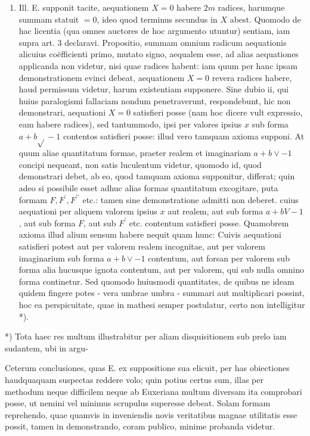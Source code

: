 \documentclass[10pt]{article}
\begin{document}
\begin{enumerate}
  \item Ill. E. supponit tacite, aequationem \(X=0\) habere \(2 m\) radices, harumque summam statuit \(=0\), ideo quod terminus secundus in \(X\) abest. Quomodo de hac licentia (qua omnes auctores de hoc argumento utuntur) sentiam, iam supra art. 3 declaravi. Propositio, summam omnium radicum aequationis alicuius coëfficienti primo, mutato signo, aequalem esse, ad alias aequationes applicanda non videtur, nisi quae radices habent: iam quum per hanc ipsam demonstrationem evinci debeat, aequationem \(X=0\) revera radices habere, haud permissum videtur, harum existentiam supponere. Sine dubio ii, qui huius paralogismi fallaciam nondum penetraverunt, respondebunt, hic non demonstrari, aequationi \(X=0\) satisfieri posse (nam hoc dicere vult expressio, eam habere radices), sed tantummodo, ipsi per valores ipsius \(x\) sub forma \(a+b \sqrt{ }-1\) contentos satisfieri posse: illud vero tamquam axioma supponi. At quum aliae quantitatum formae, praeter realem et imaginariam \(a+b \vee-1\) concipi nequeant, non satis luculentum videtur, quomodo id, quod demonstrari debet, ab eo, quod tamquam axioma supponitur, differat; quin adeo si possibile esset adhuc alias formas quantitatum excogitare, puta formam \(F, F^{\prime}, F^{\prime \prime}\) etc.: tamen sine demonstratione admitti non deberet. cuius aequationi per aliquem valorem ipsius \(x\) aut realem, aut sub forma \(a+b V-1\), aut sub forma \(F\), aut sub \(F^{\prime}\) etc. contentum satisfieri posse. Quamobrem axioma illud alium sensum habere nequit quam hunc: Cuivis aequationi satisfieri potest aut per valorem realem incognitae, aut per valorem imaginarium sub forma \(a+b \vee-1\) contentum, aut forsan per valorem sub forma alia hucusque ignota contentum, aut per valorem, qui sub nulla omnino forma continetur. Sed quomodo huiusmodi quantitates, de quibus ne ideam quidem fingere potes - vera umbrae umbra - summari aut multiplicari possint, hoc ea perspicuitate, quae in mathesi semper postulatur, certo non intelligitur *).

\end{enumerate}

*) Tota haec res multum illustrabitur per aliam disquisitionem sub prelo iam sudantem, ubi in argu-

Ceterum conclusiones, quas E. ex suppositione sua elicuit, per has obiectiones haudquaquam suspectas reddere volo; quin potius certus sum, illas per methodum neque difficilem neque ab Euxeriana multum diversam ita comprobari posse, ut nemini vel minimus scrupulus superesse debeat. Solam formam reprehendo, quae quamvis in inveniendis novis veritatibus magnae utilitatis esse possit, tamen in demonstrando, coram publico, minime probanda videtur.
\end{document}
